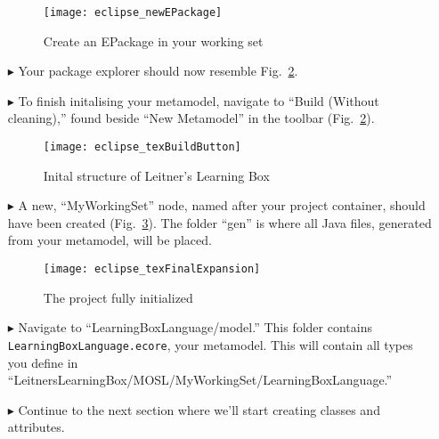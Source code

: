 \begin{itemize}
\vspace{0.5cm}

\begin{figure}[htbp]
	\centering
  \texttt{[image: eclipse\_newEPackage]}
	\caption{Create an EPackage in your working set}
	\label{fig:new_EPackage}
\end{figure} 

\clearpage

\item[$\blacktriangleright$] Your package explorer should now resemble Fig.~\ref{fig:preBuild}.

\item[$\blacktriangleright$] To finish initalising your metamodel, navigate to ``Build (Without cleaning),'' found beside ``New Metamodel'' in the
toolbar (Fig.~\ref{fig:preBuild}).

\begin{figure}[htbp]
	\centering
  \texttt{[image: eclipse\_texBuildButton]}
	\caption{Inital structure of Leitner's Learning Box}
	\label{fig:preBuild}
\end{figure} 

\vspace{0.5cm}

\item[$\blacktriangleright$] A new, ``MyWorkingSet'' node, named after your project container, should have been created (Fig.~\ref{fig:finalFiles}). The folder
``gen'' is where all Java files, generated from your metamodel, will be placed.

\vspace{0.5cm}

\begin{figure}[h!]
	\centering
  \texttt{[image: eclipse\_texFinalExpansion]}
	\caption{The project fully initialized}
	\label{fig:finalFiles}
\end{figure} 

\vspace{0.5cm}

\item[$\blacktriangleright$] Navigate to ``LearningBoxLanguage/model.'' This folder contains \\ \texttt{LearningBoxLanguage.ecore}, your metamodel. This will
contain all types you define in ``LeitnersLearningBox/MOSL/MyWorkingSet/LearningBoxLanguage.''

\item[$\blacktriangleright$] Continue to the next section where we'll start creating classes and attributes.


\end{itemize}
